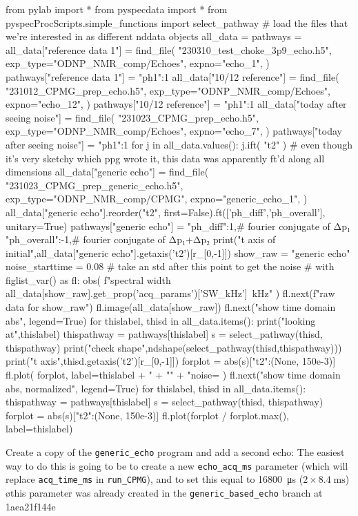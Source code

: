 \begin{python}[on]
from pylab import *
from pyspecdata import *
from pyspecProcScripts.simple_functions import select_pathway
# {{{ load the files that we're interested in as different nddata objects
all_data = {}
pathways = {}
all_data["reference data 1"] = find_file(
    "230310_test_choke_3p9_echo.h5",
    exp_type="ODNP_NMR_comp/Echoes",
    expno="echo_1",
)
pathways["reference data 1"] = {"ph1":1}
all_data["10/12 reference"] = find_file(
    "231012_CPMG_prep_echo.h5",
    exp_type="ODNP_NMR_comp/Echoes",
    expno="echo_12",
)
pathways["10/12 reference"] = {"ph1":1}
all_data["today after seeing noise"] = find_file(
    "231023_CPMG_prep_echo.h5",
    exp_type="ODNP_NMR_comp/Echoes",
    expno="echo_7",
)
pathways["today after seeing noise"] = {"ph1":1}
for j in all_data.values():
    j.ift(
        "t2"
    )  # even though it's very sketchy which ppg wrote it, this data was apparently ft'd along all dimensions
all_data["generic echo"] = find_file(
    "231023_CPMG_prep_generic_echo.h5",
    exp_type="ODNP_NMR_comp/CPMG",
    expno="generic_echo_1",
)
all_data["generic echo"].reorder("t2", first=False).ft(['ph_diff','ph_overall'], unitary=True)
pathways["generic echo"] = {"ph_diff":1,# fourier conjugate of Δp₁
        "ph_overall":-1,# fourier conjugate of Δp₁+Δp₂
        }
print("t axis of initial",all_data["generic echo"].getaxis('t2')[r_[0,-1]])
show_raw = "generic echo"
noise_starttime = 0.08 # take an std after this point to get the noise
# }}}
with figlist_var() as fl:
    obs(
        f"spectral width {all_data[show_raw].get_prop('acq_params')['SW_kHz']}~kHz"
    )
    fl.next(f"raw data for {show_raw}")
    fl.image(all_data[show_raw])
    fl.next("show time domain abs", legend=True)
    for thislabel, thisd in all_data.items():
        print("looking at",thislabel)
        thispathway = pathways[thislabel]
        s = select_pathway(thisd, thispathway)
        print("check shape",ndshape(select_pathway(thisd,thispathway)))
        print("t axis",thisd.getaxis('t2')[r_[0,-1]])
        forplot = abs(s)["t2":(None, 150e-3)]
        fl.plot(
            forplot,
            label=thislabel
            + "\n%
            + "\n"
            + "noise= %
        )
    fl.next("show time domain abs, normalized", legend=True)
    for thislabel, thisd in all_data.items():
        thispathway = pathways[thislabel]
        s = select_pathway(thisd, thispathway)
        forplot = abs(s)["t2":(None, 150e-3)]
        fl.plot(forplot / forplot.max(), label=thislabel)
\end{python}
\par
Create a copy of the \texttt{generic_echo} program and add a second echo:
The easiest way to do this is going to be to create a new \texttt{echo_acq_ms} parameter (which will replace \texttt{acq_time_ms} in \texttt{run_CPMG}), and to set this equal to 16800~μs ($2\times 8.4\;\text{ms}$)
\o{this parameter was already created in the \texttt{generic_based_echo} branch at 1aea21f144e}

